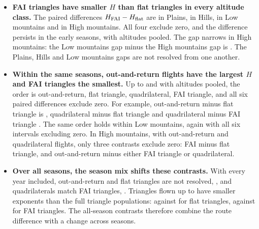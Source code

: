 \begin{itemize}
 \item \textbf{FAI triangles have smaller $H$ than flat triangles in every
 altitude class.} The paired differences $H_{\rm FAI}-H_{\rm flat}$ are
 \RouteFaiTriangleFlatTriangleAltZeroDelta{} in Plains,
 \RouteFaiTriangleFlatTriangleAltOneDelta{} in Hills,
 \RouteFaiTriangleFlatTriangleAltTwoDelta{} in Low mountains and
 \RouteFaiTriangleFlatTriangleAltThreeDelta{} in High mountains. All four exclude
 zero, and the difference persists in the early seasons,
 \RouteFaiTriangleFlatTriangleEarlyAllDelta{} with altitudes pooled. The gap
 narrows in High mountains: the Low mountains gap minus the High mountains gap
 is \RouteFaiTriangleFlatTriangleAltTwoAltThreeDelta{}. The Plains, Hills and
 Low mountains gaps are not resolved from one another.

 \item \textbf{Within the same seasons, out-and-return flights have the largest
 $H$ and FAI triangles the smallest.} Up to \RouteLastFourLabelYear{} and with
 altitudes pooled, the order is out-and-return, flat triangle, quadrilateral,
 FAI triangle, and all six paired differences exclude zero. For example,
 out-and-return minus flat triangle is
 \RouteOutAndReturnFlatTriangleEarlyAllDelta{}, quadrilateral minus flat
 triangle \RouteQuadrilateralFlatTriangleEarlyAllDelta{} and quadrilateral
 minus FAI triangle \RouteQuadrilateralFaiTriangleEarlyAllDelta{}. The same
 order holds within Low mountains, again with all six intervals excluding zero.
 In High mountains, with \RouteOutAndReturnEarlyAltThreeN{} out-and-return and
 \RouteQuadrilateralEarlyAltThreeN{} quadrilateral flights, only three
 contrasts exclude zero: FAI minus flat triangle, and out-and-return minus
 either FAI triangle or quadrilateral.

 \item \textbf{Over all seasons, the season mix shifts these contrasts.} With
 every year included, out-and-return and flat triangles are not resolved,
 \RouteOutAndReturnFlatTriangleAllDelta{}, and quadrilaterals match FAI
 triangles, \RouteQuadrilateralFaiTriangleAllDelta{}. Triangles flown up to
 \RouteLastFourLabelYear{} have smaller exponents than the full triangle
 populations: \RouteFlatTriangleEarlyAllH{} against \RouteFlatTriangleAllH{}
 for flat triangles, \RouteFaiTriangleEarlyAllH{} against
 \RouteFaiTriangleAllH{} for FAI triangles. The all-season contrasts
 therefore combine the route difference with a change across seasons.


\end{itemize}
